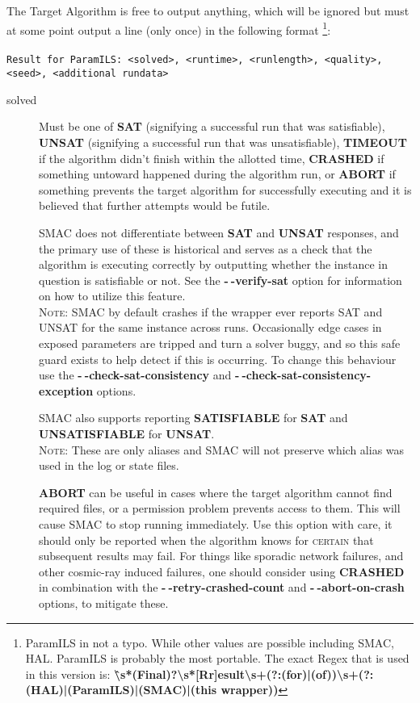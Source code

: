 \documentclass[manual.tex]{subfiles}
\begin{document}
The Target Algorithm is free to output anything, which will be ignored
but must at some point output a line (only once) in the following
format%
\footnote{ParamILS in not a typo. While other values are possible including
SMAC, HAL. ParamILS is probably the most portable. The exact Regex
that is used in this version is: \textbf{\^\textbackslash{}s{*}(Final)?\textbackslash{}s{*}{[}Rr{]}esult\textbackslash{}s+(?:(for)|(of))\textbackslash{}s+(?:(HAL)|(ParamILS)|(SMAC)|(this
wrapper))}}:%
\\
\\
\texttt{Result for ParamILS: <solved>, <runtime>, <runlength>, <quality>, <seed>, <additional rundata>} 
\begin{description}

\item [{solved}] Must be one of \textbf{SAT} (signifying a successful run that was satisfiable), \textbf{UNSAT} (signifying a successful run that was unsatisfiable), \textbf{TIMEOUT} if the algorithm didn't finish within the allotted time, \textbf{CRASHED} if something untoward happened during the algorithm run, or \textbf{ABORT} if something prevents the target algorithm for successfully executing and it is believed that further attempts would be futile. 

SMAC does not differentiate between \textbf{SAT} and \textbf{UNSAT} responses, and the primary use of these is historical and serves as a check that the algorithm is executing correctly by outputting whether the instance in question is satisfiable or not. See the \textbf{-$\!~$-verify-sat} option for information on how to utilize this feature. 
\\
\textsc{Note:} SMAC by default crashes if the wrapper ever reports SAT and UNSAT for the same instance across runs. Occasionally edge cases in exposed parameters are tripped and turn a solver buggy, and so this safe guard exists to help detect if this is occurring. To change this behaviour use the \textbf{-$\!~$-check-sat-consistency} and \textbf{-$\!~$-check-sat-consistency-exception} options.

SMAC also supports reporting \textbf{SATISFIABLE} for \textbf{SAT} and \textbf{UNSATISFIABLE} for \textbf{UNSAT}.
\\ \textsc{Note:} These are only aliases and SMAC will not preserve which alias was used in the log or state files.

\textbf{ABORT} can be useful in
cases where the target algorithm cannot find required files, or a
permission problem prevents access to them. This will cause SMAC to
stop running immediately. Use this option with care, it should only be reported when the algorithm knows for \textsc{certain} that subsequent results may fail. For things like sporadic network failures, and other cosmic-ray induced failures, one should consider using \textbf{CRASHED} in combination with the \textbf{-$\!~$-retry-crashed-count}  and \textbf{-$~\!\!$-abort-on-crash} options, to mitigate these.


\end{description}
\end{document}
